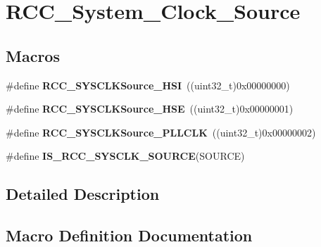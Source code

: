 \hypertarget{group___r_c_c___system___clock___source}{}\section{R\+C\+C\+\_\+\+System\+\_\+\+Clock\+\_\+\+Source}
\label{group___r_c_c___system___clock___source}
\subsection*{Macros}
\begin{DoxyCompactItemize}
\item 
\#define {\bfseries R\+C\+C\+\_\+\+S\+Y\+S\+C\+L\+K\+Source\+\_\+\+H\+SI}~((uint32\+\_\+t)0x00000000)\hypertarget{group___r_c_c___system___clock___source_ga0f392254e74dd965c48edd5aad148e20}{}\label{group___r_c_c___system___clock___source_ga0f392254e74dd965c48edd5aad148e20}

\item 
\#define {\bfseries R\+C\+C\+\_\+\+S\+Y\+S\+C\+L\+K\+Source\+\_\+\+H\+SE}~((uint32\+\_\+t)0x00000001)\hypertarget{group___r_c_c___system___clock___source_gabeae110e41833842f8620647ea0ce85a}{}\label{group___r_c_c___system___clock___source_gabeae110e41833842f8620647ea0ce85a}

\item 
\#define {\bfseries R\+C\+C\+\_\+\+S\+Y\+S\+C\+L\+K\+Source\+\_\+\+P\+L\+L\+C\+LK}~((uint32\+\_\+t)0x00000002)\hypertarget{group___r_c_c___system___clock___source_ga9301b7a07a7cb8c2c6ed87b619c1c966}{}\label{group___r_c_c___system___clock___source_ga9301b7a07a7cb8c2c6ed87b619c1c966}

\item 
\#define {\bfseries I\+S\+\_\+\+R\+C\+C\+\_\+\+S\+Y\+S\+C\+L\+K\+\_\+\+S\+O\+U\+R\+CE}(S\+O\+U\+R\+CE)
\end{DoxyCompactItemize}


\subsection{Detailed Description}


\subsection{Macro Definition Documentation}

